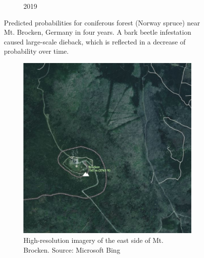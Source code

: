 \begin{figure}[H]
\begin{subfigure}[t]{0.22\textwidth}
        \caption{2019}
        \end{subfigure}
        \hfill
        \caption{Predicted probabilities for coniferous forest (Norway spruce) near Mt. Brocken, Germany in four years. A bark beetle infestation caused large-scale dieback, which is reflected in a decrease of probability over time.}
        \label{fig:brocken_probabilities}
        \end{figure}

        \begin{figure}[H]
        \centering
        \begin{subfigure}[t]{0.24\textwidth}
        \centering
        \includegraphics[width=\linewidth,height=\linewidth]{figs_06/brocken_bing.png}
        \caption{High-resolution imagery of the east side of Mt. Brocken. Source: Microsoft Bing}
        \end{subfigure}
        \hfill
        \begin{subfigure}[t]{0.24\textwidth}
        \centering

\end{subfigure}
\end{figure}
